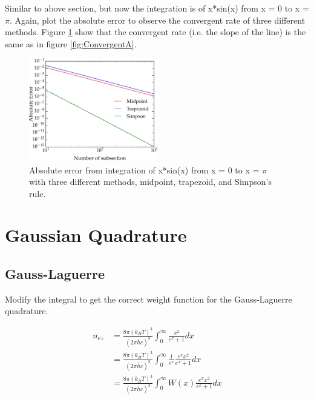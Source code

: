 \documentclass[11pt,letterpaper]{article}
\begin{document}
Similar to above section, but now the integration is of x*sin(x) from x = 0 to x = $\pi$. Again, plot the absolute error to observe the convergent rate of three different methods. Figure \ref{fig:ConvergentB} show that the convergent rate (i.e. the slope of the line) is the same as in figure \ref{fig:ConvergentA}. 

\begin{figure}[h!]
	\centering
	\includegraphics[width=0.5\textwidth]{ConvergentB}
	\caption{Absolute error from integration of x*sin(x) from x = 0 to x = $\pi$ with three different methods, midpoint, trapezoid, and Simpson's rule.}
	\label{fig:ConvergentB}
\end{figure}

\newpage
\section{Gaussian Quadrature}

\subsection{Gauss-Laguerre}

Modify the integral to get the correct weight function for the Gauss-Laguerre quadrature.

\begin{align*}
n_{e^{\pm}} &= \frac{8\pi(k_B T)^3}{(2\pi \bar{h} c)^3} \int_{0}^{\infty} \frac{x^2}{e^x+1}dx \\
                    &= \frac{8\pi(k_B T)^3}{(2\pi \bar{h} c)^3} \int_{0}^{\infty} \frac{1}{e^x} \frac{e^x x^2}{e^x+1}dx \\
                    &= \frac{8\pi(k_B T)^3}{(2\pi \bar{h} c)^3} \int_{0}^{\infty} W(x) \frac{e^x x^2}{e^x+1}dx
\end{align*}
\end{document}
